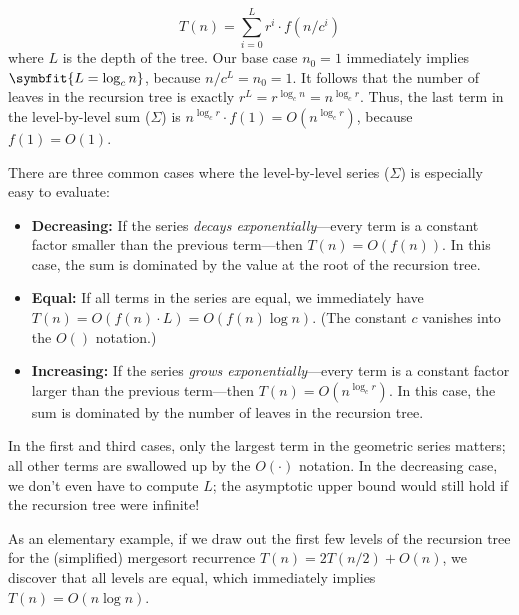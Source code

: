 \begin{equation}
T(n) = \sum_{i=0}^{L} r^i \cdot f(n/c^i) \tag{$\Sigma$}
\label{eq:sigma}
\end{equation}
where $L$ is the depth of the tree. Our base case $n_0 = 1$ immediately implies $\symbfit{L = \log_c n}$, because $n/c^L = n_0 = 1$. It follows that the number of leaves in the recursion tree is exactly $r^L = r^{\log_c n} = n^{\log_c r}$. Thus, the last term in the level-by-level sum ($\Sigma$) is $n^{\log_c r} \cdot f(1) = O(n^{\log_c r})$, because $f(1) = O(1)$.

There are three common cases where the level-by-level series ($\Sigma$) is especially easy to evaluate:

\begin{itemize}
\item \textbf{Decreasing:} If the series \emph{decays exponentially}—every term is a constant factor smaller than the previous term—then $T(n) = O( f(n))$. In this case, the sum is dominated by the value at the root of the recursion tree.

\item \textbf{Equal:} If all terms in the series are equal, we immediately have $T(n) = O(f(n) \cdot L) = O(f(n) \log n)$. (The constant $c$ vanishes into the $O()$ notation.)

\item \textbf{Increasing:} If the series \emph{grows exponentially}—every term is a constant factor larger than the previous term—then $T(n) = O(n^{\log_c r})$. In this case, the sum is dominated by the number of leaves in the recursion tree.
\end{itemize}
In the first and third cases, only the largest term in the geometric series matters; all other terms are swallowed up by the $O(\cdot)$ notation. In the decreasing case, we don’t even have to compute $L$; the asymptotic upper bound would still hold if the recursion tree were infinite!

As an elementary example, if we draw out the first few levels of the recursion tree for the (simplified) mergesort recurrence $T(n) = 2T(n/2) + O(n)$, we discover that all levels are equal, which immediately implies $T(n) = O(n \log n)$.

